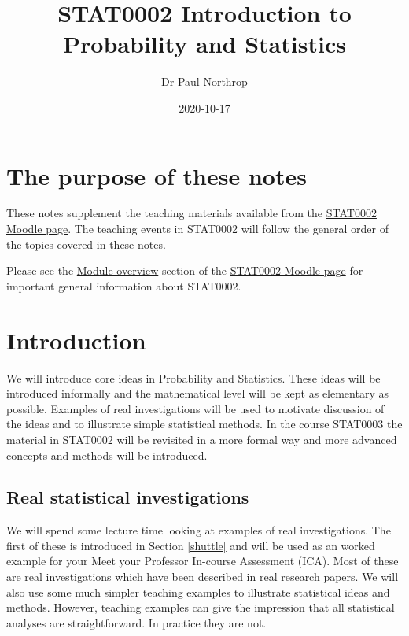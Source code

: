 \documentclass[
  11pt,
  british,
  openany, a4paper]{book}
\title{STAT0002 Introduction to Probability and Statistics}
\author{Dr Paul Northrop}
\date{2020-10-17}
\begin{document}
\maketitle

{
\setcounter{tocdepth}{1}
\tableofcontents
}
\hypertarget{the-purpose-of-these-notes}{%
\chapter*{The purpose of these notes}\label{the-purpose-of-these-notes}}

These notes supplement the teaching materials available from the \href{https://moodle.ucl.ac.uk/course/view.php?id=8579}{STAT0002 Moodle page}. The teaching events in STAT0002 will follow the general order of the topics covered in these notes.

Please see the \href{https://moodle.ucl.ac.uk/course/view.php?id=8579\&section=1}{Module overview} section of the \href{https://moodle.ucl.ac.uk/course/view.php?id=8579}{STAT0002 Moodle page} for important general information about STAT0002.

\hypertarget{introduction}{%
\chapter{Introduction}\label{introduction}}

We will introduce core ideas in Probability and Statistics. These ideas will be introduced informally and the mathematical level will be kept as elementary as possible. Examples of real investigations will be used to motivate discussion of the ideas and to illustrate simple statistical methods. In the course STAT0003 the material in STAT0002 will be revisited in a more formal way and more advanced concepts and methods will be introduced.

\hypertarget{real}{%
\section{Real statistical investigations}\label{real}}

We will spend some lecture time looking at examples of real investigations. The first of these is introduced in Section \ref{shuttle} and will be used as an worked example for your Meet your Professor In-course Assessment (ICA). Most of these are real investigations which have been described in real research papers. We will also use some much simpler teaching examples to illustrate statistical ideas and methods. However, teaching examples can give the impression that all statistical analyses are straightforward.
In practice they are not.
\end{document}
